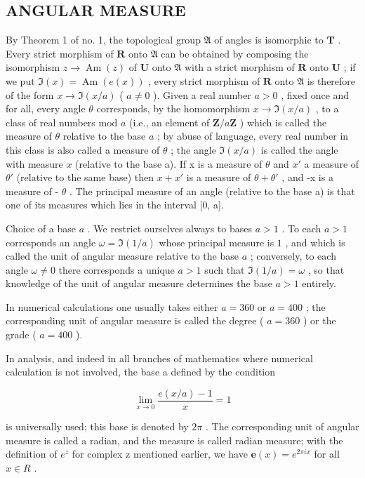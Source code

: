 \subsection{ANGULAR MEASURE}

By Theorem 1 of no. 1, the topological group \(\mathfrak{A}\) of angles is isomorphic to \(\mathbf{T}\) . Every strict morphism of \(\mathbf{R}\) onto \(\mathfrak{A}\) can be obtained by composing the isomorphism \(z \to \operatorname{Am}(z)\) of \(\mathbf{U}\) onto \(\mathfrak{A}\) with a strict morphism of \(\mathbf{R}\) onto \(\mathbf{U}\) ; if we put \(\Im(x) = \operatorname{Am}(e(x))\) , every strict morphism of \(\mathbf{R}\) onto \(\mathfrak{A}\) is therefore of the form \(x \to \Im(x/a)\) ( \(a \neq 0\) ). Given a real number \(a > 0\) , fixed once and for all, every angle \(\theta\) corresponds, by the homomorphism \(x \to \Im(x/a)\) , to a class of real numbers mod \(a\) (i.e., an element of \(\mathbf{Z}/a\mathbf{Z}\) ) which is called the measure of \(\theta\) relative to the base \(a\) ; by abuse of language, every real number in this class is also called a measure of \(\theta\) ; the angle \(\Im(x/a)\) is called the angle with measure \(x\) (relative to the base a). If x is a measure of \(\theta\) and \(x'\) a measure of \(\theta'\) (relative to the same base) then \(x + x'\) is a measure of \(\theta + \theta'\) , and -x is a measure of - \(\theta\) . The principal measure of an angle (relative to the base a) is that one of its measures which lies in the interval {[}0, a{]}.

Choice of a base \(a\) . We restrict ourselves always to bases \(a > 1\) . To each \(a > 1\) corresponds an angle \(\omega = \Im(1/a)\) whose principal measure is \(1\) , and which is called the unit of angular measure relative to the base \(a\) ; conversely, to each angle \(\omega \neq 0\) there corresponds a unique \(a > 1\) such that \(\Im(1/a) = \omega\) , so that knowledge of the unit of angular measure determines the base \(a > 1\) entirely.

In numerical calculations one usually takes either \(a = 360\) or \(a = 400\) ; the corresponding unit of angular measure is called the degree ( \(a = 360\) ) or the grade ( \(a = 400\) ).

In analysis, and indeed in all branches of mathematics where numerical calculation is not involved, the base a defined by the condition

\[
\lim _ {x \rightarrow 0} \frac {e (x / a) - 1}{x} = 1
\]

is universally used; this base is denoted by \(2\pi\) . The corresponding unit of angular measure is called a radian, and the measure is called radian measure; with the definition of \(e^{z}\) for complex z mentioned earlier, we have \(\boldsymbol{e}(x)=e^{2\pi ix}\) for all \(x\in R\) .

